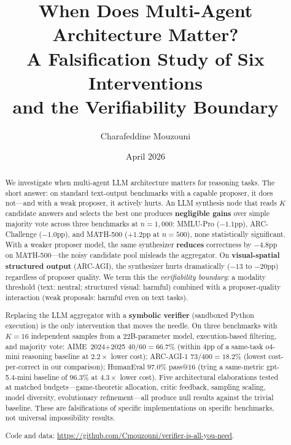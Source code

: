 \documentclass[11pt]{amsart}
\newcommand\1{{\mathds{1}}}
\theoremstyle{definition}
\theoremstyle{remark}
\numberwithin{equation}{section}
\begin{document}
\title[When Does Multi-Agent Architecture Matter?]
{When Does Multi-Agent Architecture Matter?\\[3pt]
A Falsification Study of Six Interventions\\[2pt]
and the Verifiability Boundary}

\author{Charafeddine Mouzouni}

\address{OPIT -- Open Institute of Technology, and Cohorte AI, Paris, France.}

\date{April 2026}

\begin{abstract}
We investigate when multi-agent LLM architecture matters for reasoning tasks.
The short answer: on standard text-output benchmarks with a capable proposer, it does not---and with a weak proposer, it actively hurts.
An LLM synthesis node that reads $K$ candidate answers and selects the best one produces \textbf{negligible gains} over simple majority vote across three benchmarks at $n\!=\!1{,}000$: MMLU-Pro ($-1.1$pp), ARC-Challenge ($-1.0$pp), and MATH-500 ($+1.2$pp at $n\!=\!500$), none statistically significant.
With a weaker proposer model, the same synthesizer \textbf{reduces} correctness by $-4.8$pp on MATH-500---the noisy candidate pool misleads the aggregator.
On \textbf{visual-spatial structured output} (ARC-AGI), the synthesizer hurts dramatically ($-13$ to $-20$pp) regardless of proposer quality.
We term this the \emph{verifiability boundary}: a modality threshold (text: neutral; structured visual: harmful) combined with a proposer-quality interaction (weak proposals: harmful even on text tasks).

Replacing the LLM aggregator with a \textbf{symbolic verifier} (sandboxed Python execution) is the only intervention that moves the needle.
On three benchmarks with $K\!=\!16$ independent samples from a $22$B-parameter model, execution-based filtering, and majority vote:
AIME~2024+2025 $40/60 = 66.7\%$ (within $4$pp of a same-task o4-mini reasoning baseline at $2.2\times$ lower cost);
ARC-AGI-1 $73/400 = 18.2\%$ (lowest cost-per-correct in our comparison);
HumanEval $97.0\%$ pass@$16$ (tying a same-metric gpt-5.4-mini baseline of $96.3\%$ at $4.3\times$ lower cost).
Five architectural elaborations tested at matched budgets---game-theoretic allocation, critic feedback, sampling scaling, model diversity, evolutionary refinement---all produce null results against the trivial baseline.
These are falsifications of specific implementations on specific benchmarks, not universal impossibility results.

Code and data: \url{https://github.com/Cmouzouni/verifier-is-all-you-need}.
\end{abstract}
\end{document}
